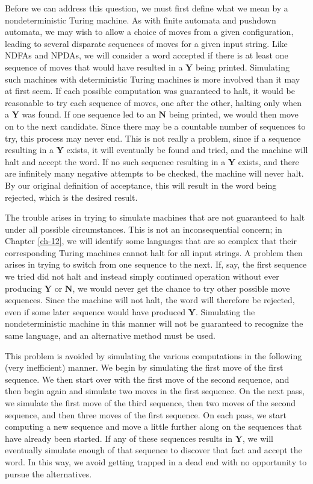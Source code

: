 Before we can address this question, we must first define what we mean by a
nondeterministic Turing machine. As with finite automata and pushdown automata,
we may wish to allow a choice of moves from a given configuration, leading to
several disparate sequences of moves for a given input string. Like NDFAs and
NPDAs, we will consider a word accepted if there is at least one sequence of
moves that would have resulted in a $\pmb{Y}$ being printed. Simulating such
machines with deterministic Turing machines is more involved than it may at
first seem. If each possible computation was guaranteed to halt, it would be
reasonable to try each sequence of moves, one after the other, halting only when
a $\pmb{Y}$ was found. If one sequence led to an $\pmb{N}$ being printed, we
would then move on to the next candidate. Since there may be a countable number
of sequences to try, this process may never end. This is not really a problem,
since if a sequence resulting in a $\pmb{Y}$ exists, it will eventually be found
and tried, and the machine will halt and accept the word. If no such sequence
resulting in a $\pmb{Y}$ exists, and there are infinitely many negative
attempts to be checked, the machine will never halt. By our original definition
of acceptance, this will result in the word being rejected, which is the desired
result.

The trouble arises in trying to simulate machines that are not guaranteed to
halt under all possible circumstances. This is not an inconsequential concern;
in Chapter \ref{ch-12}, we will identify some languages that are so complex that their
corresponding Turing machines cannot halt for all input strings. A problem then
arises in trying to switch from one sequence to the next. If, say, the first
sequence we tried did not halt and instead simply continued operation without
ever producing $\pmb{Y}$ or $\pmb{N}$, we would never get the chance to try
other possible move sequences. Since the machine will not halt, the word will
therefore be rejected, even if some later sequence would have produced
$\pmb{Y}$. Simulating the nondeterministic machine in this manner will not be
guaranteed to recognize the same language, and an alternative method must be
used.

This problem is avoided by simulating the various computations in the following
(very inefficient) manner. We begin by simulating the first move of the first
sequence. We then start over with the first move of the second sequence, and
then begin again and simulate two moves in the first sequence. On the next pass,
we simulate the first move of the third sequence, then two moves of the second
sequence, and then three moves of the first sequence. On each pass, we start
computing a new sequence and move a little further along on the sequences that
have already been started. If any of these sequences results in $\pmb{Y}$, we
will eventually simulate enough of that sequence to discover that fact and
accept the word. In this way, we avoid getting trapped in a dead end with no
opportunity to pursue the alternatives.

